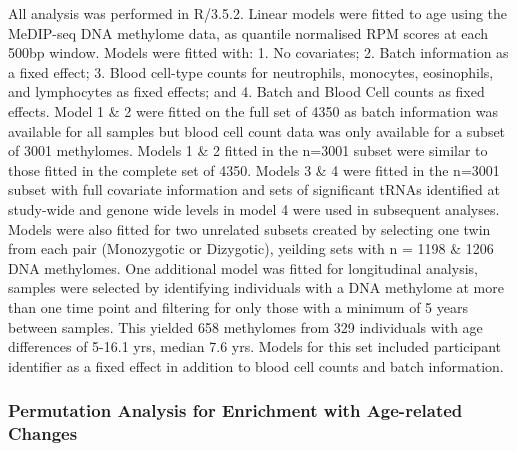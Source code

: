 \documentclass[]{book}
\begin{document}
All analysis was performed in R/3.5.2.
Linear models were fitted to age using the MeDIP-seq DNA methylome data, as quantile normalised RPM scores at each 500bp window.
Models were fitted with: 1. No covariates; 2. Batch information as a fixed effect; 3. Blood cell-type counts for neutrophils, monocytes, eosinophils, and lymphocytes as fixed effects; and 4. Batch and Blood Cell counts as fixed effects.
Model 1 \& 2 were fitted on the full set of 4350 as batch information was available for all samples but blood cell count data was only available for a subset of 3001 methylomes.
Models 1 \& 2 fitted in the n=3001 subset were similar to those fitted in the complete set of 4350.
Models 3 \& 4 were fitted in the n=3001 subset with full covariate information and sets of significant tRNAs identified at study-wide and genone wide levels in model 4 were used in subsequent analyses.
Models were also fitted for two unrelated subsets created by selecting one twin from each pair (Monozygotic or Dizygotic), yeilding sets with n = 1198 \& 1206 DNA methylomes.
One additional model was fitted for longitudinal analysis, samples were selected by identifying individuals with a DNA methylome at more than one time point and filtering for only those with a minimum of 5 years between samples.
This yielded 658 methylomes from 329 individuals with age differences of 5-16.1 yrs, median 7.6 yrs.
Models for this set included participant identifier as a fixed effect in addition to blood cell counts and batch information.

\hypertarget{AgeErichmentPermutation}{%
\subsubsection{Permutation Analysis for Enrichment with Age-related Changes}\label{AgeErichmentPermutation}}
\end{document}
